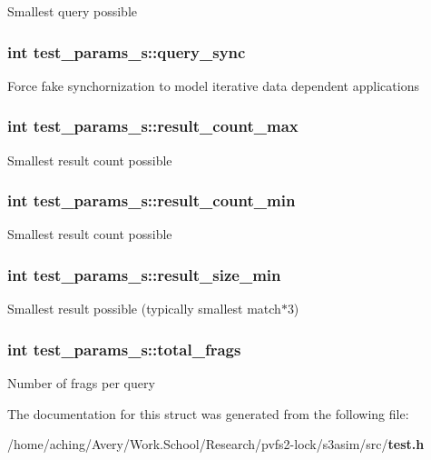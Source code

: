 Smallest query possible 
\subsubsection{\setlength{\rightskip}{0pt plus 5cm}int \bf{test\_\-params\_\-s::query\_\-sync}}\label{structtest__params__s_b4811c82cc35709567b4bf73fec205c7}


Force fake synchornization to model iterative data dependent applications 
\subsubsection{\setlength{\rightskip}{0pt plus 5cm}int \bf{test\_\-params\_\-s::result\_\-count\_\-max}}\label{structtest__params__s_4356334ca99e81f3c36915a69e6353c8}


Smallest result count possible 
\subsubsection{\setlength{\rightskip}{0pt plus 5cm}int \bf{test\_\-params\_\-s::result\_\-count\_\-min}}\label{structtest__params__s_48c96d1df49cd2a9f3e504b79ed42228}


Smallest result count possible 
\subsubsection{\setlength{\rightskip}{0pt plus 5cm}int \bf{test\_\-params\_\-s::result\_\-size\_\-min}}\label{structtest__params__s_2ff74cf7a6ac7f1e01d0aa33963c962e}


Smallest result possible (typically smallest match$\ast$3) 
\subsubsection{\setlength{\rightskip}{0pt plus 5cm}int \bf{test\_\-params\_\-s::total\_\-frags}}\label{structtest__params__s_5255777e54fc081593d4e3c8e1b2f218}


Number of frags per query 

The documentation for this struct was generated from the following file:\begin{CompactItemize}
\item 
/home/aching/Avery/Work.School/Research/pvfs2-lock/s3asim/src/\bf{test.h}\end{CompactItemize}
